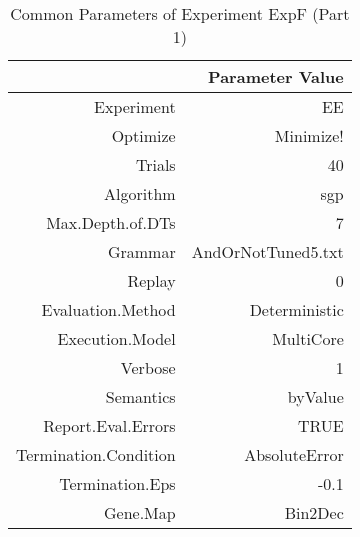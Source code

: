 \begin{table}[ht]
\centering
\begin{tabular}{rr}
  \hline
 & Parameter Value \\ 
  \hline
Experiment & EE \\ 
  Optimize & Minimize! \\ 
  Trials & 40 \\ 
  Algorithm & sgp \\ 
  Max.Depth.of.DTs & 7 \\ 
  Grammar & AndOrNotTuned5.txt \\ 
  Replay & 0 \\ 
  Evaluation.Method & Deterministic \\ 
  Execution.Model & MultiCore \\ 
  Verbose & 1 \\ 
  Semantics & byValue \\ 
  Report.Eval.Errors & TRUE \\ 
  Termination.Condition & AbsoluteError \\ 
  Termination.Eps & -0.1 \\ 
  Gene.Map & Bin2Dec \\ 
   \hline
\end{tabular}
\caption{Common Parameters of Experiment ExpF (Part 1)} 
\end{table}
